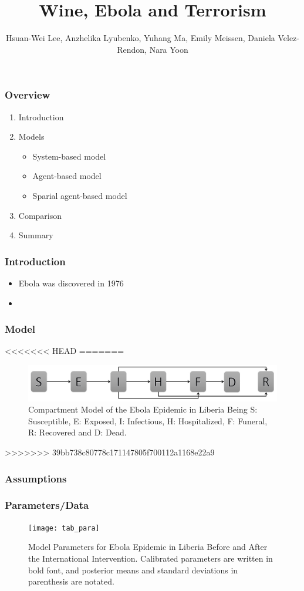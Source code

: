 \documentclass[30pt]{beamer}
\author{ Hsuan-Wei Lee,
  Anzhelika Lyubenko,
  Yuhang Ma,
  Emily Meissen,
  Daniela Velez-Rendon,
    Nara Yoon}
\title[]{Wine, Ebola and Terrorism}
\begin{document}
\begin{frame}[t,plain]
    \titlepage
\end{frame}

\begin{frame}[t,plain]
    \frametitle{Overview}
\begin{enumerate}
\vfill
\item Introduction
\item Models
\begin{itemize}
\item System-based model
\item Agent-based model
\item Sparial agent-based model
\end{itemize}
\item Comparison
\item Summary
\end{enumerate}
\end{frame}

\begin{frame}
\frametitle{Introduction}
\begin{itemize}
\item Ebola was discovered in 1976
\item 
\end{itemize}
\end{frame}

\begin{frame}
\frametitle{Model}

<<<<<<< HEAD
=======
\begin{figure}[!h]
  \centering
  \includegraphics[width=1\textwidth]{compartmentNoFlow}
  \caption{Compartment Model of the Ebola Epidemic in Liberia \newline  Being S: Susceptible, E: Exposed, I: Infectious, H: Hospitalized, F: Funeral,  R: Recovered and D: Dead. } 
\label{fig:compartment} 
\end{figure}
>>>>>>> 39bb738c80778c171147805f700112a1168e22a9
\end{frame}

\begin{frame}
\frametitle{Assumptions}
\end{frame}

\begin{frame}
\frametitle{Parameters/Data}
\begin{figure}[!h]
  \centering
  \texttt{[image: tab\_para]}
  \caption{Model Parameters for Ebola Epidemic in Liberia Before and After the International Intervention. Calibrated parameters are written in bold font, and posterior means and standard deviations in parenthesis are notated. } 
\label{fig:compartment} 
\end{figure}
\end{frame}
\end{document}
